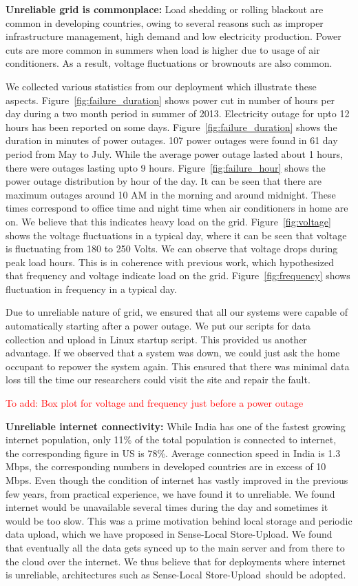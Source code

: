 \documentclass[10pt]{sensys-proc}
\newcommand{\redcolor}[1]{\textcolor{red}{#1}}
\newcommand{\figref}[1]{Figure~\ref{#1}}
\newcommand{\paradigm}{Sense-Local Store-Upload}
\newcommand{\paradigms}{Sense-Local Store-Upload~}
\begin{document}
\noindent \textbf{Unreliable grid is commonplace:} Load shedding or rolling blackout are common in developing countries, owing to several reasons such as improper infrastructure management, high demand and low electricity production. Power cuts are more common in summers when load is higher due to usage of air conditioners. As a result, voltage fluctuations or brownouts are also common.

\noindent We collected various statistics from our deployment which illustrate these aspects. \figref{fig:failure_duration} shows power cut in number of hours per day during a two month period in summer of 2013. Electricity outage for upto 12 hours has been reported on some days. \figref{fig:failure_duration} shows the duration in minutes of power outages. 107 power outages were found in 61 day period from May to July. While the average power outage lasted about 1 hours, there were outages lasting upto 9 hours. \figref{fig:failure_hour} shows the power outage distribution by hour of the day. It can be seen that there are maximum outages around 10 AM in the morning and around midnight. These times correspond to office time and night time when air conditioners in home are on. We believe that this indicates heavy load on the grid. \figref{fig:voltage} shows the voltage fluctuations in a typical day, where it can be seen that voltage is fluctuating from 180 to 250 Volts. We can observe that voltage drops during peak load hours. This is in coherence with previous work\cite{nplug}, which hypothesized that frequency and voltage indicate load on the grid. \figref{fig:frequency} shows fluctuation in frequency in a typical day.

\noindent Due to unreliable nature of grid, we ensured that all our systems were capable of automatically starting after a power outage. We put our scripts for data collection and upload in Linux startup script. This provided us another advantage. If we observed that a system was down, we could just ask the home occupant to repower the system again. This ensured that there was minimal data loss till the time our researchers could visit the site and repair the fault.

\redcolor{To add: Box plot for voltage and frequency just before a power outage}


\noindent \textbf{Unreliable internet connectivity:} While India has one of the fastest growing internet population, only 11\% of the total population is connected to internet, the corresponding figure in US is 78\%\cite{meyer}. Average connection speed in India is 1.3 Mbps, the corresponding numbers in developed countries are in excess of 10 Mbps\cite{state_of_internet}. Even though the condition of internet has vastly improved in the previous few years, from practical experience, we have found it to unreliable. We found internet would be unavailable several times during the day and sometimes it would be too slow. This was a prime motivation behind local storage and periodic data upload, which we have proposed in \paradigm. We found that eventually all the data gets synced up to the main server and from there to the cloud over the internet. We thus believe that for deployments where internet is unreliable, architectures such as \paradigms should be adopted.
\end{document}

